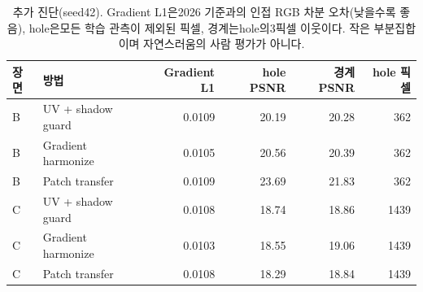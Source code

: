 \begin{table}[htbp]\centering\scriptsize
\caption{추가 진단(seed42). Gradient L1은2026 기준과의 인접 RGB 차분 오차(낮을수록 좋음), hole은모든 학습 관측이 제외된 픽셀, 경계는hole의3픽셀 이웃이다. 작은 부분집합이며 자연스러움의 사람 평가가 아니다.}
\begin{tabular}{llrrrr}\toprule 장면 & 방법 & Gradient L1 & hole PSNR & 경계 PSNR & hole 픽셀\\\midrule
B & UV + shadow guard & 0.0109 & 20.19 & 20.28 & 362 \\
B & Gradient harmonize & 0.0105 & 20.56 & 20.39 & 362 \\
B & Patch transfer & 0.0109 & 23.69 & 21.83 & 362 \\
C & UV + shadow guard & 0.0108 & 18.74 & 18.86 & 1439 \\
C & Gradient harmonize & 0.0103 & 18.55 & 19.06 & 1439 \\
C & Patch transfer & 0.0108 & 18.29 & 18.84 & 1439 \\\bottomrule\end{tabular}\end{table}